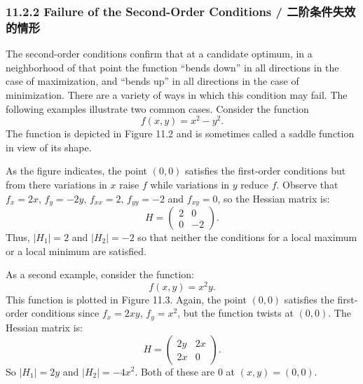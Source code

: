 \subsubsection{11.2.2 Failure of the Second-Order Conditions / 二阶条件失效的情形}

\begin{original}
The second-order conditions confirm that at a candidate optimum, in a neighborhood of that point the function ``bends down'' in all directions in the case of maximization, and ``bends up'' in all directions in the case of minimization. There are a variety of ways in which this condition may fail. The following examples illustrate two common cases. Consider the function
\[
f(x, y) = x^2 - y^2.
\]
The function is depicted in Figure 11.2 and is sometimes called a saddle function in view of its shape.

As the figure indicates, the point $(0,0)$ satisfies the first-order conditions but from there variations in $x$ raise $f$ while variations in $y$ reduce $f$. Observe that $f_x = 2x$, $f_y = -2y$, $f_{xx} = 2$, $f_{yy} = -2$ and $f_{xy} = 0$, so the Hessian matrix is:
\[
H = \begin{pmatrix} 2 & 0 \\ 0 & -2 \end{pmatrix}.
\]
Thus, $|H_1| = 2$ and $|H_2| = -2$ so that neither the conditions for a local maximum or a local minimum are satisfied.

As a second example, consider the function:
\[
f(x, y) = x^2 y.
\]
This function is plotted in Figure 11.3. Again, the point $(0,0)$ satisfies the first-order conditions since $f_x = 2xy$, $f_y = x^2$, but the function twists at $(0,0)$. The Hessian matrix is:
\[
H = \begin{pmatrix} 2y & 2x \\ 2x & 0 \end{pmatrix}.
\]
So $|H_1| = 2y$ and $|H_2| = -4x^2$. Both of these are 0 at $(x, y) = (0,0)$.
\end{original}
